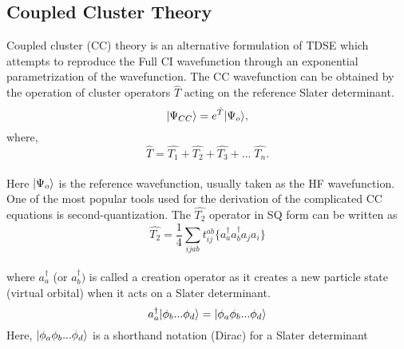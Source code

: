 \subsection{Coupled Cluster Theory} 
Coupled cluster (CC) theory\cite{} is an alternative formulation of TDSE which attempts to 
reproduce the Full CI wavefunction through an exponential parametrization
of the wavefunction. The CC wavefunction can be obtained by the operation of cluster
operators $\hat{T}$ acting on the reference Slater determinant. 
\\
\begin{equation}
| \Psi_{CC} \rangle = e^{\hat{T}}| \Psi_{o} \rangle , 
\end{equation}
where,
\begin{equation}
 \hat{T} = \hat{T_1} + \hat{T_2} + \hat{T_3} + ... \;\hat {T_n}.
\end{equation}
\\
Here $| \Psi_{o} \rangle$ is the reference wavefunction, usually taken as the HF
wavefunction. One of the most popular tools used for the derivation of the 
complicated CC equations is second-quantization\cite{JorgensenSimons81}.
The $\hat{T_2}$ operator in SQ form can be written as
\\
\begin{equation}
\hat{T_2} = \frac{1}{4}\sum_{ijab}t^{ab}_{ij}\{a^\dagger_aa^\dagger_ba_ja_i\}
\end{equation}
\\
where ${a}^\dagger_a$ (or ${a}^\dagger_b)$ is called a creation operator as it 
creates a new particle state (virtual orbital) when it acts on a Slater determinant.
\begin{equation}
{a}^\dagger_a| \phi_b...\phi_d \rangle = | \phi_a\phi_b...\phi_d \rangle
\end{equation}
Here, $| \phi_a\phi_b...\phi_d \rangle$ is a shorthand notation (Dirac) for a Slater determinant
